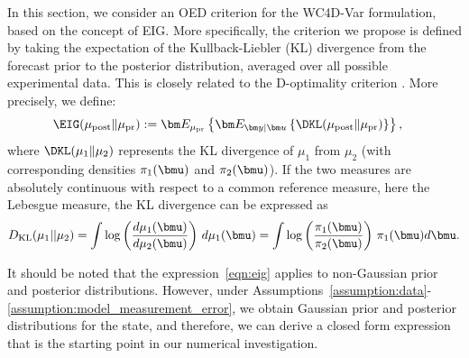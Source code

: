 \documentclass{aims} %
\theoremstyle{definition}
\begin{document}
In this section, we consider an OED  criterion for the WC4D-Var formulation, based on the concept of EIG. 
More specifically,  the criterion we propose is defined by taking the expectation of the Kullback-Liebler (KL) divergence from  the forecast prior to the posterior distribution, averaged over all possible experimental data.
%
This is closely related to the D-optimality criterion \cite{Alen, Huan_Jagalur_Marzouk_2024, Kiefer1959OptimumED}. More precisely, we define:  
%
\begin{align}\label{eqn:eig}
\begin{aligned}
 \EIG(\mu_{\text{post}} \| \mu_{\text{pr}})&:=
  \bm E_{\mu_{\text{pr}}} \left\{   \bm E_{\bm y|\bm u} \left\{  \DKL (\mu_{\text{post}} \| \mu_{\text{pr}})\right\} \right\},
 \end{aligned}
\end{align}
where  $\DKL(\mu_1 \| \mu_2)$ represents the KL divergence 
of $\mu_1$ from $\mu_2$ (with
 corresponding densities  $\pi_1(\bmu)$ and $\pi_2(\bmu)$). If the two measures are  absolutely continuous with respect to a common reference measure, here the Lebesgue measure, the KL divergence can be expressed as 
\begin{equation}\label{eqn:kldef}
D_{\text{KL}}( \mu_1 || \mu_2) = \int \log\left(\frac{d\mu_1(\bmu)}{d\mu_2(\bmu)}\right) \, d\mu_1(\bmu) 
= 
\int \log\left(\frac{\pi_{1}(\bmu)}{\pi_{2}(\bmu)}\right) \,\pi_{1}(\bmu)  d{\bmu}.
\end{equation}



It should be noted that the expression~\eqref{eqn:eig} applies to non-Gaussian prior and posterior distributions. However, under Assumptions~\ref{assumption:data}-\ref{assumption:model_measurement_error},
 we obtain Gaussian prior and posterior distributions for the state, and therefore, we can derive a closed form expression that is the starting point in our numerical investigation. 
\end{document}
